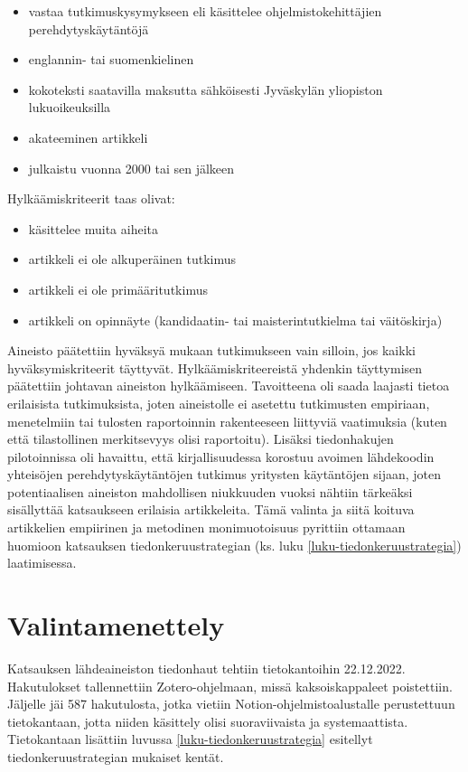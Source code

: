 \documentclass[utf8]{gradu3}
\begin{document}
\begin{itemize}
    \item vastaa tutkimuskysymykseen eli käsittelee ohjelmistokehittäjien perehdytyskäytäntöjä
    \item englannin- tai suomenkielinen
    \item kokoteksti saatavilla maksutta sähköisesti Jyväskylän yliopiston lukuoikeuksilla
    \item akateeminen artikkeli
    \item julkaistu vuonna 2000 tai sen jälkeen
\end{itemize}

Hylkäämiskriteerit taas olivat:

\begin{itemize}
    \item käsittelee muita aiheita
    \item artikkeli ei ole alkuperäinen tutkimus
    \item artikkeli ei ole primääritutkimus
    \item artikkeli on opinnäyte (kandidaatin- tai maisterintutkielma tai väitöskirja)
\end{itemize}

Aineisto päätettiin hyväksyä mukaan tutkimukseen vain silloin, jos kaikki hyväksymiskriteerit täyttyvät. Hylkäämiskriteereistä yhdenkin täyttymisen päätettiin johtavan aineiston hylkäämiseen. Tavoitteena oli saada laajasti tietoa erilaisista tutkimuksista, joten aineistolle ei asetettu tutkimusten empiriaan, menetelmiin tai tulosten raportoinnin rakenteeseen liittyviä vaatimuksia (kuten että tilastollinen merkitsevyys olisi raportoitu). Lisäksi tiedonhakujen pilotoinnissa oli havaittu, että kirjallisuudessa korostuu avoimen lähdekoodin yhteisöjen perehdytyskäytäntöjen tutkimus yritysten käytäntöjen sijaan, joten potentiaalisen aineiston mahdollisen niukkuuden vuoksi nähtiin tärkeäksi sisällyttää katsaukseen erilaisia artikkeleita. Tämä valinta ja siitä koituva artikkelien empiirinen ja metodinen monimuotoisuus pyrittiin ottamaan huomioon katsauksen tiedonkeruustrategian (ks. luku \ref{luku-tiedonkeruustrategia}) laatimisessa.

\section{Valintamenettely}

Katsauksen lähdeaineiston tiedonhaut tehtiin tietokantoihin 22.12.2022. Hakutulokset tallennettiin Zotero-ohjelmaan, missä kaksoiskappaleet poistettiin. Jäljelle jäi 587 hakutulosta, jotka vietiin Notion-ohjelmistoalustalle perustettuun tietokantaan, jotta niiden käsittely olisi suoraviivaista ja systemaattista. Tietokantaan lisättiin luvussa \ref{luku-tiedonkeruustrategia} esitellyt tiedonkeruustrategian mukaiset kentät.
\end{document}
